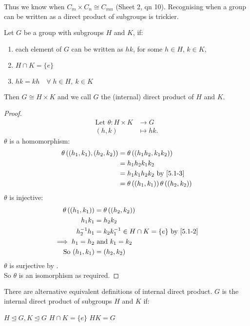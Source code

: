 Thus we know when $C_m \times C_n \cong C_{mn}$ (Sheet 2, qn 10).
Recognising when a group can be written as a direct product of subgroups is trickier.

\begin{proposition}
  Let $G$ be a group with subgroups $H$ and $K$, if:
  \begin{enumerate}
    \item each element of $G$ can be written as $hk$, for some $h \in H$, $k \in K$, \label{5.1-1}
    \item $H \cap K = \{ e \}$ \label{5.1-2}
    \item $hk = kh \quad \forall \; h \in H,\ k \in K$ \label{5.1-3}
  \end{enumerate} 
  Then $G \cong H \times K$ and we call $G$ the (internal) direct product of $H$ and $K$.
\end{proposition} 

\begin{proof}
  \begin{align*}
    \text{Let } \theta : H \times K &\to G \\
    (h, k) &\mapsto hk.
  \end{align*} 
  $\theta$ is a homomorphism:
  \begin{align*}
    \theta \left( (h_1, k_1), (h_2, k_2) \right) &= \theta \left( (h_1 h_2, k_1 k_2) \right) \\
    &= h_1 h_2 k_1 k_2 \\
    &= h_1 k_1 h_2 k_2 \text{ by } \Cref{5.1-3} \\
    &= \theta \left( (h_1, k_1) \right) \theta \left( (h_2, k_2) \right)
  \end{align*} 
  $\theta$ is injective:
  \begin{align*}
    \theta \left( (h_1, k_1) \right) &= \theta \left( (h_2, k_2) \right) \\
    h_1 k_1 &= h_2 k_2 \\
    h_2^{-1} h_1 &= k_2 k_1^{-1} \in H \cap K = \{ e \} \text{ by \Cref{5.1-2}} \\
    \implies h_1 = h_2 &\text{ and } k_1 = k_2 \\
    \text{So } (h_1, k_1) &= (h_2, k_2)
  \end{align*} 
  $\theta$ is surjective by . \\
  So $\theta$ is an isomorphism as required.
\end{proof} 

\begin{remark} \label{rem:internal2}
  There are alternative equivalent definitions of internal direct product.
  $G$ is the internal direct product of subgroups $H$ and $K$ if:
  \begin{symenum}
     $H \trianglelefteq G, K \trianglelefteq G$ \label{5.1-1'}
     $H \cap K = \{ e \}$ \label{5.1-2'}
     $HK = G$ \label{5.1-3'}
  \end{symenum} 
\end{remark} 

